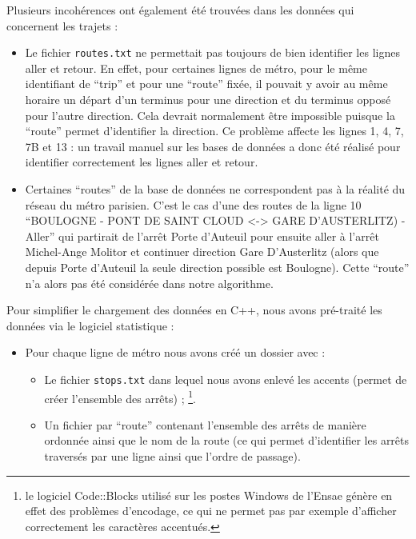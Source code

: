 \documentclass[,french]{article}
\providecommand{\tightlist}{%
  \setlength{\itemsep}{0pt}\setlength{\parskip}{0pt}}
\let\rmarkdownfootnote\footnote%
\def\footnote{\protect\rmarkdownfootnote}
\begin{document}
Plusieurs incohérences ont également été trouvées dans les données qui
concernent les trajets :

\begin{itemize}
\item
  Le fichier \texttt{routes.txt} ne permettait pas toujours de bien
  identifier les lignes aller et retour. En effet, pour certaines lignes
  de métro, pour le même identifiant de ``trip'' et pour une ``route''
  fixée, il pouvait y avoir au même horaire un départ d'un terminus pour
  une direction et du terminus opposé pour l'autre direction. Cela
  devrait normalement être impossible puisque la ``route'' permet
  d'identifier la direction. Ce problème affecte les lignes 1, 4, 7, 7B
  et 13 : un travail manuel sur les bases de données a donc été réalisé
  pour identifier correctement les lignes aller et retour.\\
\item
  Certaines ``routes'' de la base de données ne correspondent pas à la
  réalité du réseau du métro parisien. C'est le cas d'une des routes de
  la ligne 10 ``BOULOGNE - PONT DE SAINT CLOUD
  \textless{}-\textgreater{} GARE D'AUSTERLITZ) - Aller'' qui partirait
  de l'arrêt Porte d'Auteuil pour ensuite aller à l'arrêt Michel-Ange
  Molitor et continuer direction Gare D'Austerlitz (alors que depuis
  Porte d'Auteuil la seule direction possible est Boulogne). Cette
  ``route'' n'a alors pas été considérée dans notre algorithme.
\end{itemize}

Pour simplifier le chargement des données en C++, nous avons pré-traité
les données via le logiciel statistique \faRProject :

\begin{itemize}
\tightlist
\item
  Pour chaque ligne de métro nous avons créé un dossier avec :

  \begin{itemize}
  \item
    Le fichier \texttt{stops.txt} dans lequel nous avons enlevé les
    accents (permet de créer l'ensemble des arrêts) ; \footnote{le
      logiciel Code::Blocks utilisé sur les postes Windows de l'Ensae
      génère en effet des problèmes d'encodage, ce qui ne permet pas par
      exemple d'afficher correctement les caractères accentués.}.
  \item
    Un fichier par ``route'' contenant l'ensemble des arrêts de manière
    ordonnée ainsi que le nom de la route (ce qui permet d'identifier
    les arrêts traversés par une ligne ainsi que l'ordre de passage).
  \end{itemize}
\end{itemize}
\end{document}
